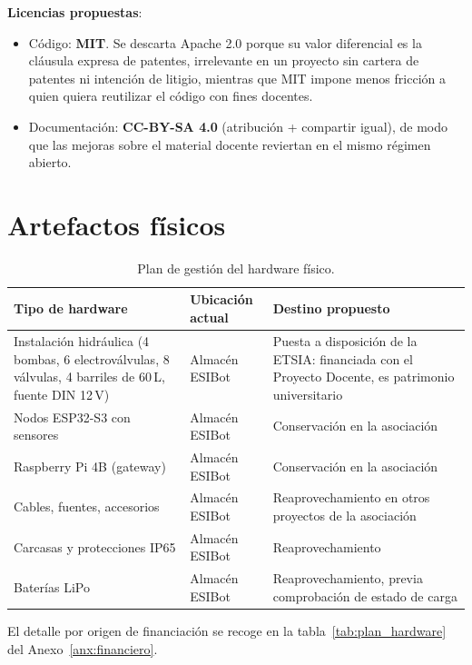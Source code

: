 \textbf{Licencias propuestas}:
\begin{itemize}[leftmargin=*]
    \item C\'odigo: \textbf{MIT}. Se descarta Apache 2.0 porque su valor
    diferencial es la cl\'ausula expresa de patentes, irrelevante en un
    proyecto sin cartera de patentes ni intenci\'on de litigio, mientras
    que MIT impone menos fricci\'on a quien quiera reutilizar el c\'odigo
    con fines docentes.
    \item Documentaci\'on: \textbf{CC-BY-SA 4.0} (atribuci\'on +
    compartir igual), de modo que las mejoras sobre el material docente
    reviertan en el mismo r\'egimen abierto.
\end{itemize}

\section{Artefactos f\'isicos}

\begin{table}[H]
    \centering
    \caption{Plan de gesti\'on del hardware f\'isico.}
    \label{tab:fisico}
    \begin{tabular}{p{4cm}p{4cm}p{4.5cm}}
        \toprule
        \textbf{Tipo de hardware} & \textbf{Ubicaci\'on actual} & \textbf{Destino propuesto} \\
        \midrule
        Instalaci\'on hidr\'aulica (4 bombas, 6 electrov\'alvulas, 8 v\'alvulas, 4 barriles de 60\,L, fuente DIN 12\,V) & Almac\'en ESIBot & Puesta a disposici\'on de la ETSIA: financiada con el Proyecto Docente, es patrimonio universitario \\
        Nodos ESP32-S3 con sensores   & Almac\'en ESIBot & Conservaci\'on en la asociaci\'on \\
        Raspberry Pi 4B (gateway)     & Almac\'en ESIBot & Conservaci\'on en la asociaci\'on \\
        Cables, fuentes, accesorios   & Almac\'en ESIBot & Reaprovechamiento en otros proyectos de la asociaci\'on \\
        Carcasas y protecciones IP65  & Almac\'en ESIBot & Reaprovechamiento \\
        Bater\'ias LiPo               & Almac\'en ESIBot & Reaprovechamiento, previa comprobaci\'on de estado de carga \\
        \bottomrule
    \end{tabular}
\end{table}

El detalle por origen de financiaci\'on se recoge en la
tabla~\ref{tab:plan_hardware} del Anexo~\ref{anx:financiero}.

